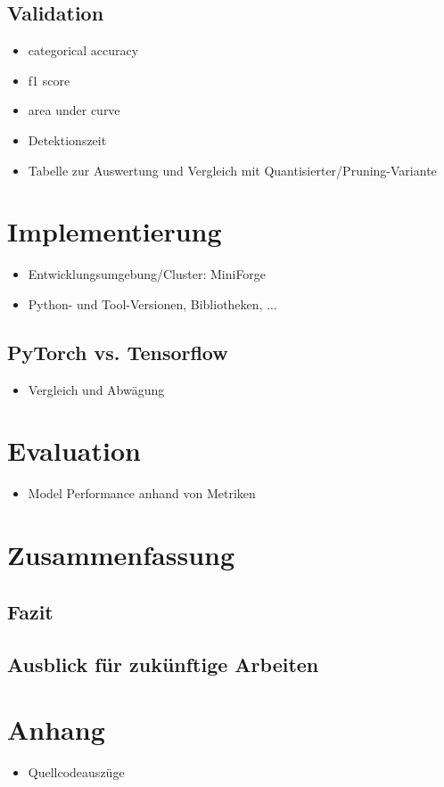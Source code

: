 \documentclass{article}
\begin{document}
    \subsection{Validation}
    \begin{itemize}
        \item categorical accuracy
        \item f1 score
        \item area under curve
        \item Detektionszeit
        \item Tabelle zur Auswertung und Vergleich mit Quantisierter/Pruning-Variante
    \end{itemize}

    \newpage
    \section{Implementierung}
    \begin{itemize}
        \item Entwicklungsumgebung/Cluster: MiniForge
        \item Python- und Tool-Versionen, Bibliotheken, ... %
    \end{itemize}
    \subsection{PyTorch vs. Tensorflow}
    \begin{itemize}
        \item Vergleich und Abwägung
    \end{itemize}
    \section{Evaluation}
    \begin{itemize}
        \item Model Performance anhand von Metriken
    \end{itemize}

    \section{Zusammenfassung}
    \subsection{Fazit}
    \subsection{Ausblick für zukünftige Arbeiten}

    
    

    \section*{Anhang}
    \begin{itemize}
        \item Quellcodeauszüge
    \end{itemize}
\end{document}
